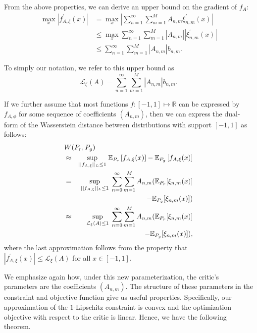 \documentclass[letterpaper]{article} %
\begin{document}
From the above properties, we can derive an upper bound on the gradient of $f_A$:
\begin{equation}
\begin{aligned}
\max_x \left|f^\prime_{A,\xi}(x)\right|
&= \max_x \left|\sum_{n=1}^\infty \sum_{m=1}^M A_{n,m} \xi^\prime_{n,m}(x) \right|\\
&\leq \max_x \sum_{n=1}^\infty \sum_{m=1}^M \left| A_{n,m} \right| \left| \xi^\prime_{n,m}(x) \right| \\
&\leq \sum_{n=1}^\infty \sum_{m=1}^M \left|A_{n,m}\right| b_{n,m}.
\end{aligned}
\end{equation}

To simply our notation, we refer to this upper bound as
\begin{equation}\label{eq:upperbound}
    \mathcal{L}_\xi(A) = \sum_{n=1}^\infty \sum_{m=1}^M |A_{n,m}| b_{n,m}.
\end{equation}

If we further assume that most functions $f: [-1, 1] \mapsto \mathbb{R}$ can be expressed by $f_{A, \phi}$ for some sequence of coefficients $(A_{n,m})$, then we can express the dual-form of the Wasserstein distance between distributions with support $[-1, 1]$ as follows:
\begin{eqnarray}\label{eq:summable_parameterization}
\lefteqn{W(P_r, P_g)}\\
&\approx& \underset{||f_{A, \xi}||_L \leq 1}{\sup}\; \mathbb{E}_{P_r}\left[ f_{A, \xi}(x)\right] - \mathbb{E}_{P_g}\left[ f_{A, \xi}(x)\right] \nonumber\\
&=& \underset{||f_{A, \xi}||_L \leq 1}{\sup}\; \sum_{n=0}^\infty \sum_{m=1}^M A_{n,m}(\mathbb{E}_{P_r}[\xi_{n,m}(x)] \\
&&- \mathbb{E}_{P_g}[\xi_{n,m}(x)]) \nonumber\\
&\approx& \underset{\mathcal{L}_\xi(A) \leq 1}{\sup}\; \sum_{n=0}^\infty \sum_{m=1}^M A_{n,m} (\mathbb{E}_{P_r}[\xi_{n,m}(x)] \\
&&- \mathbb{E}_{P_g}[\xi_{n,m}(x)]),\nonumber
\end{eqnarray}
where the last approximation follows from the property that $|f^\prime_{A, \xi}(x) | \leq \mathcal{L}_\xi(A)$ for all $x \in [-1, 1]$.

We emphasize again how, under this new parameterization, the critic's parameters are the coefficients $(A_{n,m})$. The structure of these parameters in the constraint and objective function give us useful properties.
Specifically, our approximation of the $1$-Lipschitz constraint is convex and the optimization objective with respect to the critic is linear. Hence, we have the following theorem.
\end{document}
